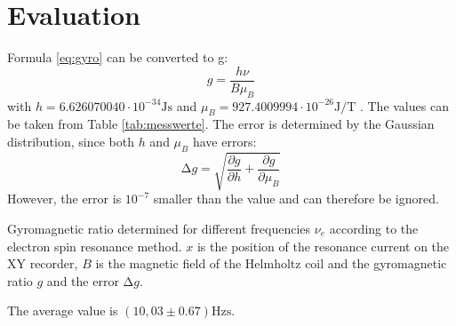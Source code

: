 \section{Evaluation}
Formula \ref{eq:gyro} can be converted to g:
\begin{equation}
  g=\frac{h\nu}{B\mu_{B}}
\end{equation}
with $h=6.626070040\cdot10^{-34}\si{\joule\second}$ \cite{3} and $\mu_B=927.4009994\cdot10^{-26}\si{\joule\per\tesla}$ \cite{2}.
The values can be taken from Table \ref{tab:messwerte}.
The error is determined by the Gaussian distribution, since both $h$ and $\mu_B$ have errors:
\begin{equation}
  \increment g = \sqrt{\frac{\partial g}{\partial h}+\frac{\partial g}{\partial \mu_B}}
\end{equation}
However, the error is $10^{-7}$ smaller than the value and can therefore be ignored.
\begin{table}
  \centering
  \caption{Gyromagnetic ratio determined for different frequencies $\nu_e$ according to the electron spin resonance method.
  $x$ is the position of the resonance current on the XY recorder,
  $B$ is the magnetic field of the Helmholtz coil and the gyromagnetic ratio $g$ and the error $\increment g$.}
  \label{tab:messwerte}
\end{table}
The average value is $(10,03\pm0.67)\si{\hertz\second}$.
